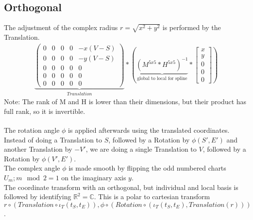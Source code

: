 \documentclass{report}
\begin{document}
\subsection{Orthogonal}
The adjustment of the complex radius $r=\sqrt{x^2+y^2}$ is performed by the Translation.
\begin{align}
\underbrace{
\begin{pmatrix}
0 & 0 & 0 & 0 & -x(V-S) \\
0 & 0 & 0 & 0 & -y(V-S) \\
0 & 0 & 0 & 0 & 0 \\
0 & 0 & 0 & 0 & 0 \\
0 & 0 & 0 & 0 & 0
\end{pmatrix}
}_{Translation}
*(
\underbrace{
(M^{5x5} * H^{5x5})^{-1}
}_{\text{global to local for spline}}
*\begin{bmatrix} x \\ y \\ 0 \\ 0 \\ 0 \end{bmatrix})
\end{align}
Note: The rank of M and H is lower than their dimensions, but their product has full rank, so it is invertible.\\\\
The rotation angle $\phi$ is applied afterwards using the translated coordinates. Instead of doing a Translation to $S$, followed by a Rotation by $\phi(S',E')$ and another Translation by $-V'$, we are doing a single Translation to $V$, followed by a Rotation by $\phi(V',E')$.\\
The complex angle $\phi$ is made smooth by flipping the odd numbered charts $U_{m};m \mod 2=1$ on the imaginary axis $y$.\\
The coordinate transform with an orthogonal, but individual and local basis is followed by identifying $\mathbb{R}^2=\mathbb{C}$. This is a polar to cartesian transform $r\circ (Translation\circ \iota_{T}(t_{S},t_{E})),\phi \circ (Rotation\circ (\iota_{T}(t_{S},t_{E}),Translation(r)))$.
\end{document}
